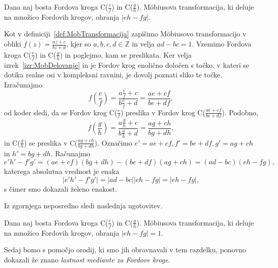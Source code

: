 \documentclass[mat1]{fmfdelo}
\begin{document}
\begin{lema}
Dana naj bosta Fordova kroga C($\frac{e}{f}$) in C($\frac{g}{h}$). M\"{o}biusova transformacija, ki deluje na množico Fordovih krogov, ohranja $|eh-fg|$.
\end{lema}

\begin{dokaz}
Kot v definiciji~\ref{def:MobTransformacija} zapišimo M\"{o}biusovo transformacijo v obliki $f(z) = \frac{az+c}{bz+d}$, kjer so $a,b,c,d \in \mathbb{Z}$ in velja $ad-bc=1$. 
Vzemimo Fordova kroga C($\frac{e}{f}$) in C($\frac{g}{h}$) in poglejmo, kam se preslikata. 
Ker velja izrek~\ref{izr:MobDelovanje} in je Fordov krog enolično določen s točko, v kateri se dotika realne osi v kompleksni ravnini, je dovolj poznati sliko te točke.
Izračunajmo
\[ f \left(\frac{e}{f} \right) = \frac{a \frac{e}{f} + c}{b \frac{e}{f} + d} = \frac{ae + cf}{be + df}, \]
od koder sledi, da se Fordov krog C($\frac{e}{f}$) preslika v Fordov krog C($\frac{ae+cf}{be+df}$).
Podobno,
\[ f \left(\frac{g}{h} \right) = \frac{a \frac{g}{h} + c}{b \frac{g}{h} + d} = \frac{ag + ch}{bg + dh}, \]
in C($\frac{g}{h}$) se preslika v C($\frac{ag+ch}{bg+dh}$).
Označimo \( e' = ae+cf, f' = be+df, g' = ag+ch \) in $h' = bg+dh$. Računajmo
\[ e'h'-f'g' = (ae+cf)(bg+dh) - (be+df)(ag+ch) = (ad - bc)(eh - fg), \]
katerega absolutna vrednost je enaka
\[ |e'h'-f'g'| = |ad-bc| |eh-fg| = |eh-fg|, \]
s čimer smo dokazali želeno enakost.
\end{dokaz}

Iz zgornjega neposredno sledi naslednja ugotovitev.

\begin{posledica}
\label{Posl:MobOhr1}
Dana naj bosta Fordova kroga C($\frac{e}{f}$) in C($\frac{g}{h}$). M\"{o}biusova transformacija, ki deluje na množico Fordovih krogov, ohranja $|eh-fg|=1$.
\end{posledica}

Sedaj bomo s pomočjo orodij, ki smo jih obravnavali v tem razdelku, ponovno dokazali že znano \emph{lastnost mediante za Fordove kroge}.
\end{document}
